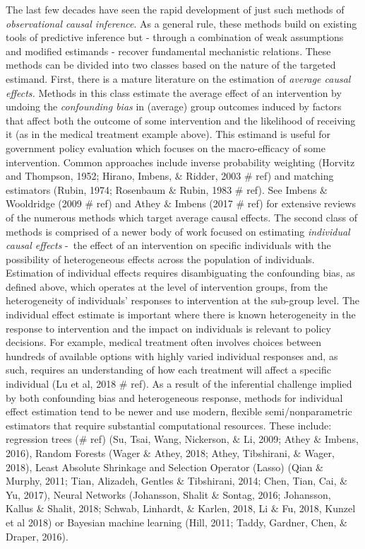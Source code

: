 \documentclass[../main.tex]{subfiles}
\begin{document}
\vspace{\baselineskip}
The last few decades have seen the rapid development of just such methods of \textit{observational causal inference}. As a general rule, these methods build on existing tools of predictive inference but - through a combination of weak assumptions and modified estimands - recover fundamental mechanistic relations. These methods can be divided into two classes based on the nature of the targeted estimand. First, there is a mature literature on the estimation of \textit{average causal effects. }Methods in this class estimate the average effect of an intervention by undoing the \textit{confounding bias} in (average) group outcomes induced by factors that affect both the outcome of some intervention and the likelihood of receiving it (as in the medical treatment example above). This estimand is useful for government policy evaluation which focuses on the macro-efficacy of some intervention. Common approaches include inverse probability weighting (Horvitz and Thompson, 1952; Hirano, Imbens, $\&$  Ridder, 2003 $\#$ ref) and matching estimators (Rubin, 1974; Rosenbaum $\&$  Rubin, 1983 $\#$ ref). See Imbens $\&$  Wooldridge (2009 $\#$ ref) and Athey $\&$  Imbens (2017 $\#$ ref) for extensive reviews of the numerous methods which target average causal effects. The second class of methods is comprised of a newer body of work focused on estimating \textit{individual causal effects }-\ the effect of an intervention on specific individuals with the possibility of heterogeneous effects across the population of individuals. Estimation of individual effects requires disambiguating the confounding bias, as defined above, which operates at the level of intervention groups, from the heterogeneity of individuals’ responses to intervention at the sub-group level. The individual effect estimate is important where there is known heterogeneity in the response to intervention and the impact on individuals is relevant to policy decisions. For example, medical treatment often involves choices between hundreds of available options with highly varied individual responses and, as such, requires an understanding of how each treatment will affect a specific individual (Lu et al, 2018 $\#$ ref). As a result of the inferential challenge implied by both confounding bias and heterogeneous response, methods for individual effect estimation tend to be newer and use modern, flexible semi/nonparametric estimators that require substantial computational resources. These include: regression trees ($\#$ ref) (Su, Tsai, Wang, Nickerson, $\&$  Li, 2009; Athey $\&$  Imbens, 2016), Random Forests (Wager $\&$  Athey, 2018; Athey, Tibshirani, $\&$  Wager, 2018), Least Absolute Shrinkage and Selection Operator (Lasso) (Qian $\&$  Murphy, 2011; Tian, Alizadeh, Gentles $\&$  Tibshirani, 2014; Chen, Tian, Cai, $\&$  Yu, 2017), Neural Networks  (Johansson, Shalit $\&$  Sontag, 2016; Johansson, Kallus $\&$  Shalit, 2018; Schwab, Linhardt, $\&$  Karlen, 2018, Li $\&$  Fu, 2018, Kunzel et al 2018) or Bayesian machine learning (Hill, 2011; Taddy, Gardner, Chen, $\&$  Draper, 2016).\par
\end{document}
